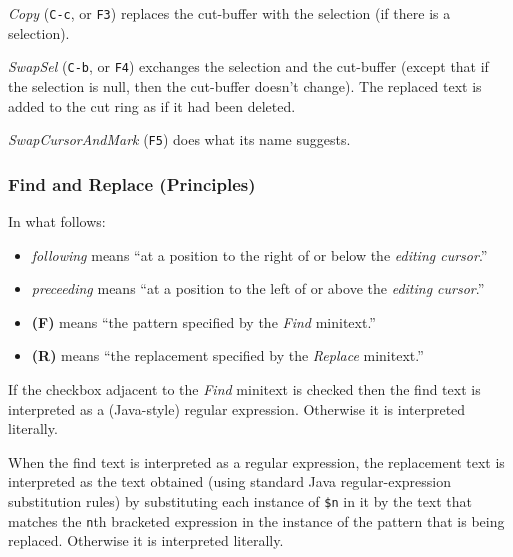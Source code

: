 \documentclass[11pt,a4paper]{article}
\begin{document}
\emph{Copy} (\texttt{C-c}, or \texttt{F3}) replaces the cut-buffer with
the selection (if there is a selection).

\emph{SwapSel} (\texttt{C-b}, or \texttt{F4}) exchanges the selection
and the cut-buffer (except that if the selection is null, then the
cut-buffer doesn't change). The replaced text is added to the cut ring
as if it had been deleted.

\emph{SwapCursorAndMark} (\texttt{F5}) does what its name suggests.

\hypertarget{find-and-replace-principles}{%
\subsubsection{Find and Replace
(Principles)}\label{find-and-replace-principles}}

In what follows:

\begin{itemize}
\item
  \emph{following} means ``at a position to the right of or below the
  \emph{editing cursor}.''
\item
  \emph{preceeding} means ``at a position to the left of or above the
  \emph{editing cursor}.''
\item
  \textbf{(F)} means ``the pattern specified by the \emph{Find}
  minitext.''
\item
  \textbf{(R)} means ``the replacement specified by the \emph{Replace}
  minitext.''
\end{itemize}

If the checkbox adjacent to the \emph{Find} minitext is checked then the
find text is interpreted as a (Java-style) regular expression. Otherwise
it is interpreted literally.

When the find text is interpreted as a regular expression, the
replacement text is interpreted as the text obtained (using standard
Java regular-expression substitution rules) by substituting each
instance of \texttt{\$n} in it by the text that matches the \texttt{n}th
bracketed expression in the instance of the pattern that is being
replaced. Otherwise it is interpreted literally.
\end{document}
